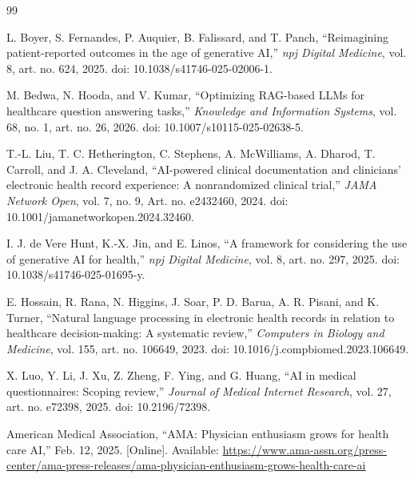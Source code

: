 \documentclass[conference]{IEEEtran}
\begin{document}


\begin{thebibliography}{99}

L. Boyer, S. Fernandes, P. Auquier, B. Falissard, and T. Panch,
``Reimagining patient-reported outcomes in the age of generative AI,''
\textit{npj Digital Medicine}, vol. 8, art. no. 624, 2025.
doi: 10.1038/s41746-025-02006-1.

M. Bedwa, N. Hooda, and V. Kumar,
``Optimizing RAG-based LLMs for healthcare question answering tasks,''
\textit{Knowledge and Information Systems}, vol. 68, no. 1,
art. no. 26, 2026.
doi: 10.1007/s10115-025-02638-5.

T.-L. Liu, T. C. Hetherington, C. Stephens, A. McWilliams,
A. Dharod, T. Carroll, and J. A. Cleveland,
``AI-powered clinical documentation and clinicians' electronic health record experience:
A nonrandomized clinical trial,''
\textit{JAMA Network Open}, vol. 7, no. 9, Art. no. e2432460, 2024.
doi: 10.1001/jamanetworkopen.2024.32460.

I. J. de Vere Hunt, K.-X. Jin, and E. Linos,
``A framework for considering the use of generative AI for health,''
\textit{npj Digital Medicine}, vol. 8, art. no. 297, 2025.
doi: 10.1038/s41746-025-01695-y.

E. Hossain, R. Rana, N. Higgins, J. Soar, P. D. Barua,
A. R. Pisani, and K. Turner,
``Natural language processing in electronic health records in relation to healthcare
decision-making: A systematic review,''
\textit{Computers in Biology and Medicine}, vol. 155,
art. no. 106649, 2023.
doi: 10.1016/j.compbiomed.2023.106649.

X. Luo, Y. Li, J. Xu, Z. Zheng, F. Ying, and G. Huang,
``AI in medical questionnaires: Scoping review,''
\textit{Journal of Medical Internet Research}, vol. 27,
art. no. e72398, 2025.
doi: 10.2196/72398.


American Medical Association,
``AMA: Physician enthusiasm grows for health care AI,''
Feb. 12, 2025. [Online].
Available: \url{https://www.ama-assn.org/press-center/ama-press-releases/ama-physician-enthusiasm-grows-health-care-ai}


\end{thebibliography}
\end{document}

